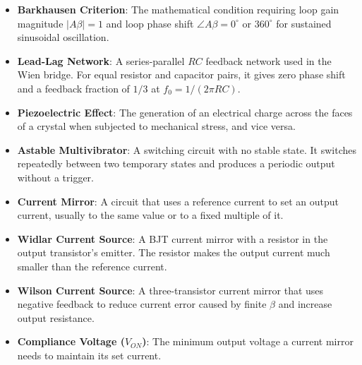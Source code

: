\documentclass[12pt,a4paper]{article}
\begin{document}
\begin{tcolorbox}[defbox, title={One-Line Definitions}, title after break={One-Line Definitions (contd.)}]
\small
{}
\begin{itemize}[leftmargin=1.5em, topsep=2pt, itemsep=4pt]
  \item \textbf{Barkhausen Criterion}: The mathematical condition requiring loop gain magnitude $|A\beta|=1$ and loop phase shift $\angle A\beta = 0^\circ$ or $360^\circ$ for sustained sinusoidal oscillation.
  \item \textbf{Lead-Lag Network}: A series-parallel $RC$ feedback network used in the Wien bridge. For equal resistor and capacitor pairs, it gives zero phase shift and a feedback fraction of $1/3$ at $f_0=1/(2\pi RC)$.
  \item \textbf{Piezoelectric Effect}: The generation of an electrical charge across the faces of a crystal when subjected to mechanical stress, and vice versa.
  \item \textbf{Astable Multivibrator}: A switching circuit with no stable state. It switches repeatedly between two temporary states and produces a periodic output without a trigger.
  \item \textbf{Current Mirror}: A circuit that uses a reference current to set an output current, usually to the same value or to a fixed multiple of it.
  \item \textbf{Widlar Current Source}: A BJT current mirror with a resistor in the output transistor's emitter. The resistor makes the output current much smaller than the reference current.
  \item \textbf{Wilson Current Source}: A three-transistor current mirror that uses negative feedback to reduce current error caused by finite $\beta$ and increase output resistance.
  \item \textbf{Compliance Voltage ($V_{ON}$)}: The minimum output voltage a current mirror needs to maintain its set current.
\end{itemize}
\end{tcolorbox}
\end{document}
